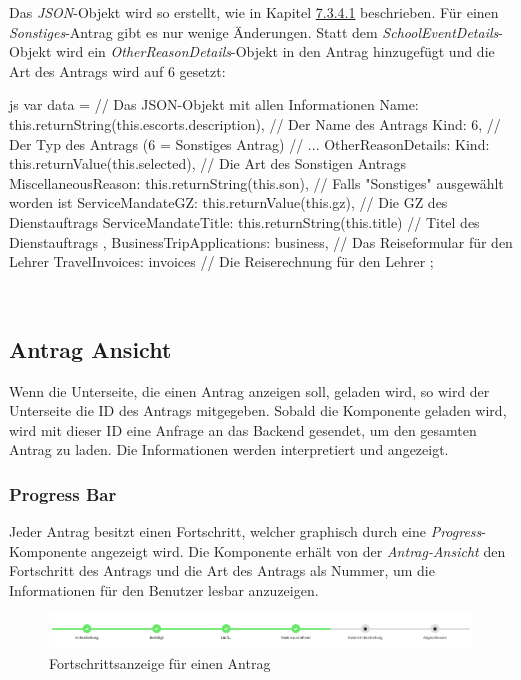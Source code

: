 Das \textit{JSON}-Objekt wird so erstellt, wie in Kapitel \hyperref[code_submit_data]{7.3.4.1} beschrieben. Für einen \textit{Sonstiges}-Antrag gibt es nur wenige Änderungen.
Statt dem \textit{SchoolEventDetails}-Objekt wird ein \textit{OtherReasonDetails}-Objekt in den Antrag hinzugefügt und die Art des Antrags wird auf 6 gesetzt:
\begin{code}{js}
var data = {		// Das JSON-Objekt mit allen Informationen
	Name: this.returnString(this.escorts.description),	// Der Name des Antrags
	Kind: 6,	// Der Typ des Antrags (6 = Sonstiges Antrag)
	// ...
	OtherReasonDetails: {
		Kind: this.returnValue(this.selected),	// Die Art des Sonstigen Antrags
		MiscellaneousReason: this.returnString(this.son),	// Falls "Sonstiges" ausgewählt worden ist
		ServiceMandateGZ: this.returnValue(this.gz),	// Die GZ des Dienstauftrags
		ServiceMandateTitle: this.returnString(this.title)	// Titel des Dienstauftrags
	},
	BusinessTripApplications: business,	// Das Reiseformular für den Lehrer
	TravelInvoices: invoices	// Die Reiserechnung für den Lehrer
};
\end{code}
~\\
\newpage
\subsection{Antrag Ansicht}
\label{sec:antrag_ansicht}
Wenn die Unterseite, die einen Antrag anzeigen soll, geladen wird, so wird der Unterseite die ID des Antrags mitgegeben. Sobald die Komponente geladen wird, wird mit dieser ID eine Anfrage an das Backend gesendet, um den gesamten Antrag zu laden. Die Informationen werden interpretiert und angezeigt.
\subsubsection{Progress Bar}
Jeder Antrag besitzt einen Fortschritt, welcher graphisch durch eine \textit{Progress}-Komponente angezeigt wird. Die Komponente erhält von der \textit{Antrag-Ansicht} den Fortschritt des Antrags und die Art des Antrags als Nummer, um die Informationen für den Benutzer lesbar anzuzeigen.
\begin{figure}
	\centering
	\includegraphics[width=1\linewidth]{images/progress}
	\caption[Fortschrittsanzeige]{Fortschrittsanzeige für einen Antrag}
	\label{fig:progress}
\end{figure}
